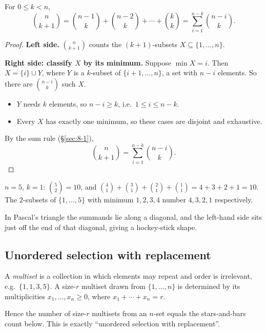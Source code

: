 \documentclass[11pt]{article}
\begin{document}
\begin{theorem}
\label{thm:hockeystick}
For $0\le k<n$,
\[
\binom{n}{k+1}=\binom{n-1}{k}+\binom{n-2}{k}+\cdots+\binom{k}{k}=\sum_{i=1}^{n-k}\binom{n-i}{k}.
\]
\end{theorem}
\begin{proof}
\textbf{Left side.} $\binom{n}{k+1}$ counts the $(k+1)$-subsets $X\subseteq\{1,\dots,n\}$.

\medskip
\textbf{Right side: classify $X$ by its minimum.} Suppose $\min X=i$. Then $X=\{i\}\cup Y$, where $Y$ is a $k$-subset of $\{i+1,\dots,n\}$, a set with $n-i$ elements. So there are $\binom{n-i}{k}$ such $X$.
\begin{itemize}
  \item $Y$ needs $k$ elements, so $n-i\ge k$, i.e.\ $1\le i\le n-k$.
  \item Every $X$ has exactly one minimum, so these cases are disjoint and exhaustive.
\end{itemize}

\medskip
By the sum rule (\S\ref{sec:8-1}),
\[
\binom{n}{k+1}=\sum_{i=1}^{n-k}\binom{n-i}{k}.
\]
\end{proof}
\begin{example}
$n=5$, $k=1$: $\binom52=10$, and $\binom41+\binom31+\binom21+\binom11=4+3+2+1=10$. The $2$-subsets of $\{1,\dots,5\}$ with minimum $1,2,3,4$ number $4,3,2,1$ respectively.
\end{example}
\begin{note}[Name]
In Pascal's triangle the summands lie along a diagonal, and the left-hand side sits just off the end of that diagonal, giving a hockey-stick shape.
\end{note}

\subsection{Unordered selection with replacement}
\label{sec:8-9}

\begin{definition}[Multiset]
A \emph{multiset} is a collection in which elements may repeat and order is irrelevant, e.g.\ $\{1,1,3,5\}$. A size-$r$ multiset drawn from $\{1,\dots,n\}$ is determined by its multiplicities $x_1,\dots,x_n\ge0$, where $x_1+\cdots+x_n=r$.
\end{definition}
\begin{note}
Hence the number of size-$r$ multisets from an $n$-set equals the stars-and-bars count below. This is exactly ``unordered selection with replacement''.
\end{note}
\end{document}
